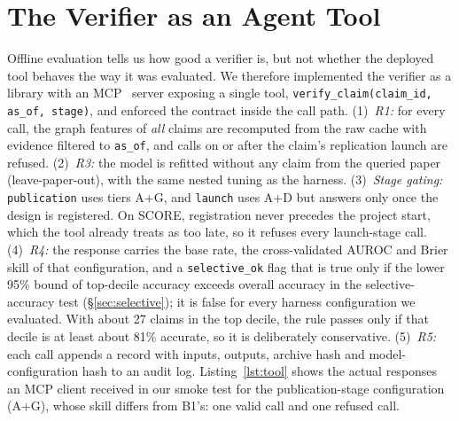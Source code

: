 \documentclass[conference]{IEEEtran}
\begin{document}
\section{The Verifier as an Agent Tool}\label{sec:tool}
Offline evaluation tells us how good a verifier is, but not whether the deployed tool behaves the way it was evaluated. We therefore implemented the verifier as a library with an MCP~\cite{mcp2024} server exposing a single tool, \texttt{verify\_claim(claim\_id, as\_of, stage)}, and enforced the contract inside the call path. (1)~\emph{R1:} for every call, the graph features of \emph{all} claims are recomputed from the raw cache with evidence filtered to \texttt{as\_of}, and calls on or after the claim's replication launch are refused. (2)~\emph{R3:} the model is refitted without any claim from the queried paper (leave-paper-out), with the same nested tuning as the harness. (3)~\emph{Stage gating:} \texttt{publication} uses tiers A+G, and \texttt{launch} uses A+D but answers only once the design is registered. On SCORE, registration never precedes the project start, which the tool already treats as too late, so it refuses every launch-stage call. (4)~\emph{R4:} the response carries the base rate, the cross-validated AUROC and Brier skill of that configuration, and a \texttt{selective\_ok} flag that is true only if the lower 95\% bound of top-decile accuracy exceeds overall accuracy in the selective-accuracy test (\S\ref{sec:selective}); it is false for every harness configuration we evaluated. With about 27 claims in the top decile, the rule passes only if that decile is at least about 81\% accurate, so it is deliberately conservative. (5)~\emph{R5:} each call appends a record with inputs, outputs, archive hash and model-configuration hash to an audit log. Listing~\ref{lst:tool} shows the actual responses an MCP client received in our smoke test for the publication-stage configuration (A+G), whose skill differs from B1's: one valid call and one refused call.


\end{document}
